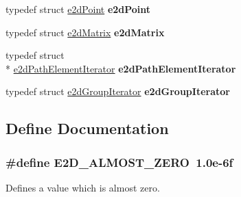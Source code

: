 \begin{DoxyCompactItemize}
\item 
\hypertarget{group__Ez2DS_ga6659ac6d13a4ebd7168ef99f8ded9201}{typedef struct \hyperlink{structe2dPoint}{e2d\-Point} {\bfseries e2d\-Point}}\label{group__Ez2DS_ga6659ac6d13a4ebd7168ef99f8ded9201}

\item 
\hypertarget{group__Ez2DS_ga097c8c058b4f43e8e154374d63432b3c}{typedef struct \hyperlink{structe2dMatrix}{e2d\-Matrix} {\bfseries e2d\-Matrix}}\label{group__Ez2DS_ga097c8c058b4f43e8e154374d63432b3c}

\item 
\hypertarget{group__Ez2DS_ga76fc6b98f46ca44dd6b09fe824160485}{typedef struct \\*
\hyperlink{structe2dPathElementIterator}{e2d\-Path\-Element\-Iterator} {\bfseries e2d\-Path\-Element\-Iterator}}\label{group__Ez2DS_ga76fc6b98f46ca44dd6b09fe824160485}

\item 
\hypertarget{group__Ez2DS_ga271ae036141142028e18270850818134}{typedef struct \hyperlink{structe2dGroupIterator}{e2d\-Group\-Iterator} {\bfseries e2d\-Group\-Iterator}}\label{group__Ez2DS_ga271ae036141142028e18270850818134}

\end{DoxyCompactItemize}


\subsection{Define Documentation}
\hypertarget{group__Ez2DS_ga48ffc9ed217e38fc9cd7cf8f9894d63c}{
\subsubsection[{E2\-D\-\_\-\-A\-L\-M\-O\-S\-T\-\_\-\-Z\-E\-R\-O}]{\setlength{\rightskip}{0pt plus 5cm}\#define {\bf E2\-D\-\_\-\-A\-L\-M\-O\-S\-T\-\_\-\-Z\-E\-R\-O}~1.\-0e-\/6f}}\label{group__Ez2DS_ga48ffc9ed217e38fc9cd7cf8f9894d63c}


Defines a value which is almost zero. 

